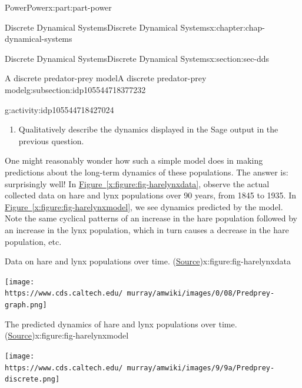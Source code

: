 \documentclass[oneside,10pt,]{book}
\newcommand{\xreffont}{\relax}
\numberwithin{equation}{section}
\begin{document}
\begin{partptx}{Power}{}{Power}{}{}{x:part:part-power}
\begin{chapterptx}{Discrete Dynamical Systems}{}{Discrete Dynamical Systems}{}{}{x:chapter:chap-dynamical-systems}
\begin{sectionptx}{Discrete Dynamical Systems}{}{Discrete Dynamical Systems}{}{}{x:section:sec-dds}
\begin{subsectionptx}{A discrete predator-prey model}{}{A discrete predator-prey model}{}{}{g:subsection:idp105544718377232}
\begin{activity}{}{g:activity:idp105544718427024}
\begin{enumerate}
\begin{sageinput}
def L(n):
	if n==0:
		return L_0
	else:
		return L(n-1) + (c*L(n-1)*H(n-1)-d*L(n-1))/nperiod
time=10
nn=range(time)
HH = [H(n) for n in nn]
LL = [L(n) for n in nn]
nH = list(zip(nn, HH))
nL = list(zip(nn, LL))
H_dots = points(nH, color='blue')
L_dots = points(nL, color='red')
p = H_dots + L_dots
p
\end{sageinput}
%
\item{}Qualitatively describe the dynamics displayed in the Sage output in the previous question.%
\end{enumerate}
\end{activity}%
%
%
One might reasonably wonder how such a simple model does in making predictions about the long-term dynamics of these populations. The answer is: surprisingly well! In \hyperref[x:figure:fig-harelynxdata]{Figure~{\xreffont\ref{x:figure:fig-harelynxdata}}}, observe the actual collected data on hare and lynx populations over 90 years, from 1845 to 1935. In \hyperref[x:figure:fig-harelynxmodel]{Figure~{\xreffont\ref{x:figure:fig-harelynxmodel}}}, we see dynamics predicted by the model. Note the same cyclical patterns of an increase in the hare population followed by an increase in the lynx population, which in turn causes a decrease in the hare population, etc.%
\begin{figureptx}{Data on hare and lynx populations over time. (\href{https://www.cds.caltech.edu/\~murray/amwiki/index.php/Predator_prey}{Source}\protect\footnotemark{})}{x:figure:fig-harelynxdata}{}%
\begin{image}{0.25}{0.5}{0.25}%
\texttt{[image: https://www.cds.caltech.edu/~murray/amwiki/images/0/08/Predprey-graph.png]}
\end{image}%
\tcblower
\end{figureptx}%
%
\begin{figureptx}{The predicted dynamics of hare and lynx populations over time. (\href{https://www.cds.caltech.edu/\~murray/amwiki/index.php/Predator_prey}{Source}\protect\footnotemark{})}{x:figure:fig-harelynxmodel}{}%
\begin{image}{0.25}{0.5}{0.25}%
\texttt{[image: https://www.cds.caltech.edu/~murray/amwiki/images/9/9a/Predprey-discrete.png]}

\end{image}
\end{figureptx}
\end{subsectionptx}
\end{sectionptx}
\end{chapterptx}
\end{partptx}
\end{document}
